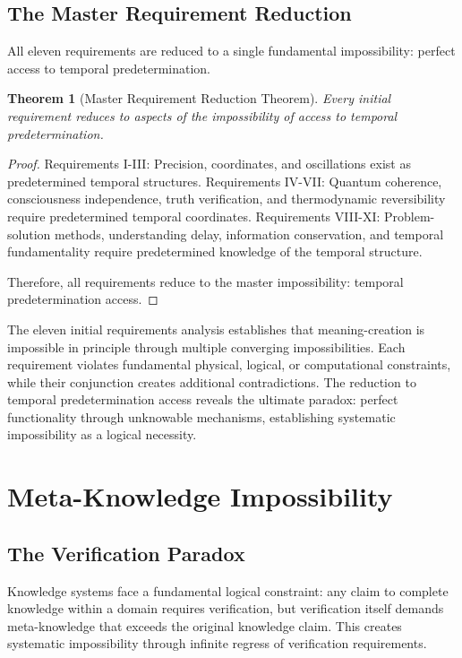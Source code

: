 \documentclass[12pt,a4paper]{article}
\newtheorem{theorem}{Theorem}[section]
\begin{document}
\subsection{The Master Requirement Reduction}

All eleven requirements are reduced to a single fundamental impossibility: perfect access to temporal predetermination.

\begin{theorem}[Master Requirement Reduction Theorem]
Every initial requirement reduces to aspects of the impossibility of access to temporal predetermination.
\end{theorem}

\begin{proof}
Requirements I-III: Precision, coordinates, and oscillations exist as predetermined temporal structures. Requirements IV-VII: Quantum coherence, consciousness independence, truth verification, and thermodynamic reversibility require predetermined temporal coordinates. Requirements VIII-XI: Problem-solution methods, understanding delay, information conservation, and temporal fundamentality require predetermined knowledge of the temporal structure.

Therefore, all requirements reduce to the master impossibility: temporal predetermination access.
\end{proof}

The eleven initial requirements analysis establishes that meaning-creation is impossible in principle through multiple converging impossibilities. Each requirement violates fundamental physical, logical, or computational constraints, while their conjunction creates additional contradictions. The reduction to temporal predetermination access reveals the ultimate paradox: perfect functionality through unknowable mechanisms, establishing systematic impossibility as a logical necessity.

\section{Meta-Knowledge Impossibility}

\subsection{The Verification Paradox}

Knowledge systems face a fundamental logical constraint: any claim to complete knowledge within a domain requires verification, but verification itself demands meta-knowledge that exceeds the original knowledge claim. This creates systematic impossibility through infinite regress of verification requirements.
\end{document}
